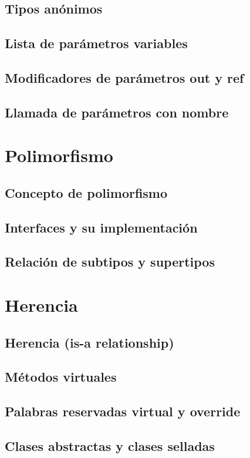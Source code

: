 \documentclass[12pt,a4paper]{report}
\begin{document}
{\section{Tipos anónimos}
\section{Lista de parámetros variables}
\section{Modificadores de parámetros out y ref}
\section{Llamada de parámetros con nombre}

\chapter{Polimorfismo}
\section{Concepto de polimorfismo}
\section{Interfaces y su implementación}
\section{Relación de subtipos y supertipos}

\chapter{Herencia}
\section{Herencia (is-a relationship)}
\section{Métodos virtuales}
\section{Palabras reservadas virtual y override}
\section{Clases abstractas y clases selladas}
}
\end{document}
